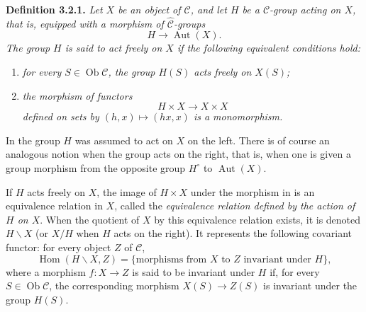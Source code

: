 \noindent{}\textbf{Definition 3.2.1.}
\textit{Let \(X\) be an object of \(\mathscr C\), and let \(H\) be a
\(\mathscr C\)-group acting on \(X\), that is, equipped with a morphism of
\(\widehat{\mathscr C}\)-groups}
\[
  H\longrightarrow\operatorname{Aut}(X).
\]
\textit{The group \(H\) is said to act \emph{freely} on \(X\) if the
following equivalent conditions hold:}
\begin{enumerate}
  \item[(i)] \textit{for every \(S\in\operatorname{Ob}\mathscr C\), the
  group \(H(S)\) acts freely on \(X(S)\);}
  \item[(ii)] \textit{the morphism of functors}
  \[
    H\times X\longrightarrow X\times X
  \]
  \textit{defined on sets by \((h,x)\mapsto(hx,x)\) is a monomorphism.}
\end{enumerate}

In  the group \(H\) was assumed to act on \(X\) on
the left. There is of course an analogous notion when the group acts on the
right, that is, when one is given a group morphism from the opposite group
\(H^{\circ}\) to \(\operatorname{Aut}(X)\).

If \(H\) acts freely on \(X\), the image of \(H\times X\) under the
morphism in  is an equivalence relation in \(X\), called the
\emph{equivalence relation defined by the action of \(H\) on \(X\)}. When
the quotient of \(X\) by this equivalence relation exists, it is denoted
\(H\backslash X\) (or \(X/H\) when \(H\) acts on the right). It represents
the following covariant functor: for every object \(Z\) of \(\mathscr C\),
\[
  \operatorname{Hom}(H\backslash X,Z)
  =\{\text{morphisms from \(X\) to \(Z\) invariant under \(H\)}\},
\]
where a morphism \(f:X\to Z\) is said to be invariant under \(H\) if, for
every \(S\in\operatorname{Ob}\mathscr C\), the corresponding morphism
\(X(S)\to Z(S)\) is invariant under the group \(H(S)\).

